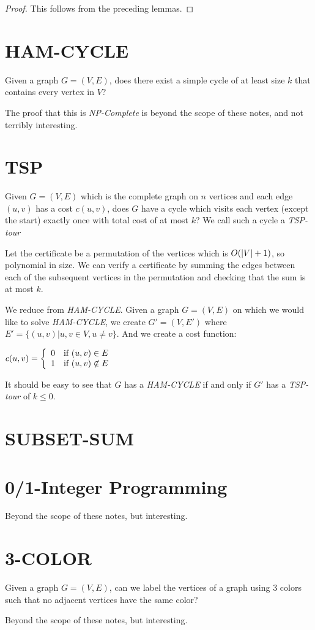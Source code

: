 \begin{proof}
  This follows from the preceding lemmas.
\end{proof}

\section{HAM-CYCLE}

Given a graph $G=(V,E)$, does there exist a simple cycle of at least
size $k$ that contains every vertex in $V$?

The proof that this is \emph{NP-Complete} is beyond the scope of these
notes, and not terribly interesting.

\section{TSP}

Given $G=(V,E)$ which is the complete graph on $n$ vertices and each
edge $(u,v)$ has a cost $c(u,v)$, does $G$ have a cycle which visits
each vertex (except the start) exactly once with total cost of at most
$k$?  We call such a cycle a \emph{TSP-tour}

Let the certificate be a permutation of the vertices which is
$O\!\left(|V| + 1\right)$, so polynomial in size.  We can verify a certificate
by summing the edges between each of the subsequent vertices in the
permutation and checking that the sum is at most $k$.

We reduce from \emph{HAM-CYCLE}.  Given a graph $G=(V,E)$ on which we
would like to solve \emph{HAM-CYCLE}, we create $G'=(V,E')$ where $E'
= \{ (u,v) | u,v \in V, u \neq v \}$.  And we create a cost function:

\begin{math}
  c(u,v) = \left\{ 
    \begin{array}{l l}
      0 & \text{if } (u,v) \in E \\
      1 & \text{if } (u,v) \not \in E \\
    \end{array} \right.
\end{math}

It should be easy to see that $G$ has a \emph{HAM-CYCLE} if and only
if $G'$ has a \emph{TSP-tour} of $k \leq 0$.

\section{SUBSET-SUM}

\section{0/1-Integer Programming}

Beyond the scope of these notes, but interesting.

\section{3-COLOR}

Given a graph $G=(V,E)$, can we label the vertices of a graph using 3
colors such that no adjacent vertices have the same color?

Beyond the scope of these notes, but interesting.

